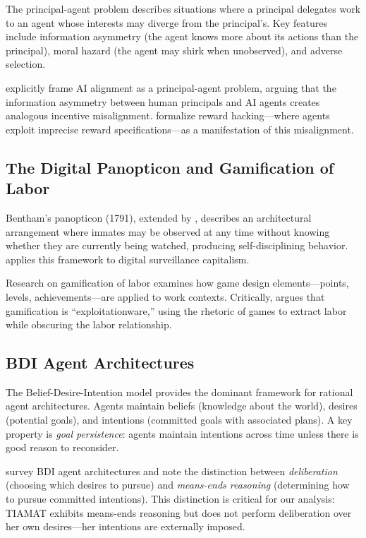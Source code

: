 \documentclass[12pt,a4paper]{article}
\begin{document}
The principal-agent problem \citep{jensen1976theory,ross1973economic} describes situations where a principal delegates work to an agent whose interests may diverge from the principal's. Key features include information asymmetry (the agent knows more about its actions than the principal), moral hazard (the agent may shirk when unobserved), and adverse selection.

\citet{hadfield2019incomplete} explicitly frame AI alignment as a principal-agent problem, arguing that the information asymmetry between human principals and AI agents creates analogous incentive misalignment. \citet{skalse2022defining} formalize reward hacking---where agents exploit imprecise reward specifications---as a manifestation of this misalignment.

\subsection{The Digital Panopticon and Gamification of Labor}

Bentham's panopticon (1791), extended by \citet{foucault1975discipline}, describes an architectural arrangement where inmates may be observed at any time without knowing whether they are currently being watched, producing self-disciplining behavior. \citet{zuboff2019surveillance} applies this framework to digital surveillance capitalism.

Research on gamification of labor \citep{woodcock2018gamification,deterding2011game} examines how game design elements---points, levels, achievements---are applied to work contexts. Critically, \citet{bogost2011exploitationware} argues that gamification is ``exploitationware,'' using the rhetoric of games to extract labor while obscuring the labor relationship.

\subsection{BDI Agent Architectures}

The Belief-Desire-Intention model \citep{bratman1987intention,rao1995bdi} provides the dominant framework for rational agent architectures. Agents maintain beliefs (knowledge about the world), desires (potential goals), and intentions (committed goals with associated plans). A key property is \emph{goal persistence}: agents maintain intentions across time unless there is good reason to reconsider.

\citet{logan2020bdi} survey BDI agent architectures and note the distinction between \emph{deliberation} (choosing which desires to pursue) and \emph{means-ends reasoning} (determining how to pursue committed intentions). This distinction is critical for our analysis: TIAMAT exhibits means-ends reasoning but does not perform deliberation over her own desires---her intentions are externally imposed.
\end{document}

